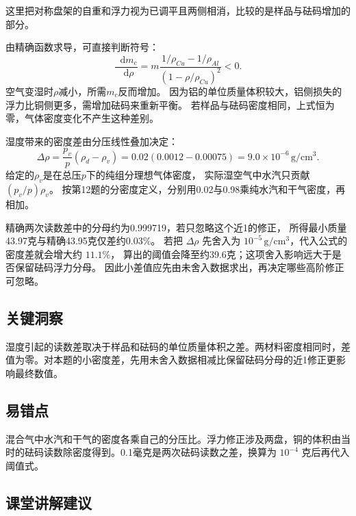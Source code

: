 \documentclass[UTF8,fontset=fandol,a4paper,11pt]{ctexart}
\newcommand{\dd}{\mathop{}\!\mathrm{d}}
\begin{document}
这里把对称盘架的自重和浮力视为已调平且两侧相消，比较的是样品与砝码增加的部分。

由精确函数求导，可直接判断符号：
\[
\frac{\dd m_c}{\dd\rho}
=m\frac{1/\rho_{Cu}-1/\rho_{Al}}
{(1-\rho/\rho_{Cu})^2}<0.
\]
空气变湿时$\rho$减小，所需$m_c$反而增加。
因为铝的单位质量体积较大，铝侧损失的浮力比铜侧更多，需增加砝码来重新平衡。
若样品与砝码密度相同，上式恒为零，气体密度变化不产生这种差别。

湿度带来的密度差由分压线性叠加决定：
\[
\Delta\rho=\frac{p_v}{p}(\rho_d-\rho_v)
=0.02(0.0012-0.00075)
=9.0\times10^{-6}\,\mathrm{g/cm^3}.
\]
给定的$\rho_v$是在总压$p$下的纯组分理想气体密度，
实际湿空气中水汽只贡献$(p_v/p)\rho_v$。
按第12题的分密度定义，分别用0.02与0.98乘纯水汽和干气密度，再相加。

精确两次读数差中的分母约为0.999719，若只忽略这个近1的修正，
所得最小质量43.97克与精确43.95克仅差约0.03\%。
若把 $\Delta\rho$ 先舍入为 $10^{-5}\,\mathrm{g/cm^3}$，代入公式的密度差就会增大约 $11.1\%$，
算出的阈值会降至约39.6克；这项舍入影响远大于是否保留砝码浮力分母。
因此小差值应先由未舍入数据求出，再决定哪些高阶修正可忽略。




\subsection*{关键洞察}

湿度引起的读数差取决于样品和砝码的单位质量体积之差。两材料密度相同时，差值为零。对本题的小密度差，先用未舍入数据相减比保留砝码分母的近1修正更影响最终数值。



\subsection*{易错点}

混合气中水汽和干气的密度各乘自己的分压比。浮力修正涉及两盘，铜的体积由当时的砝码读数除密度得到。0.1毫克是两次砝码读数之差，换算为 $10^{-4}$ 克后再代入阈值式。



\subsection*{课堂讲解建议}
\end{document}
